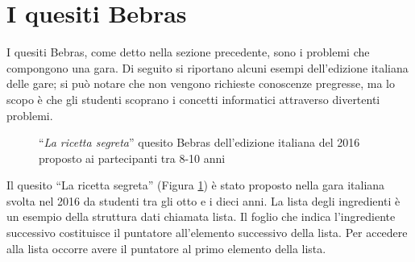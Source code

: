 \documentclass[12pt]{report}
\begin{document}
%
%
\section{I quesiti Bebras}

I quesiti Bebras, come detto nella sezione precedente, sono i problemi che compongono una gara.
Di seguito si riportano alcuni esempi dell'edizione italiana delle gare; si può notare che non vengono richieste conoscenze pregresse, ma lo scopo è che gli studenti scoprano i concetti informatici attraverso divertenti problemi.

\begin{figure}[H]
	\centering
	\caption{ ``\textit{La ricetta segreta}'' quesito Bebras dell'edizione italiana del 2016 proposto ai partecipanti tra 8-10 anni}\label{fig:ricetta}
\end{figure}

Il quesito ``La ricetta segreta'' (Figura \ref{fig:ricetta}) è stato proposto nella gara italiana svolta nel 2016 da studenti tra gli otto e i dieci anni.
La lista degli ingredienti è un esempio della struttura dati chiamata lista. Il foglio che indica l'ingrediente successivo costituisce il puntatore all'elemento successivo della lista. Per accedere alla lista occorre avere il puntatore al primo elemento della lista.
\end{document}
